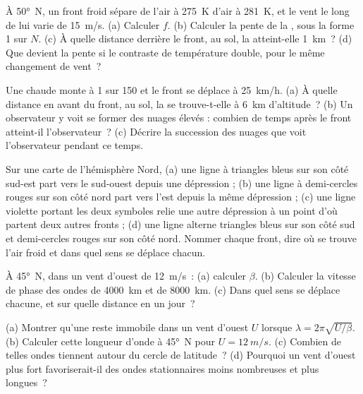 \begin{exercise}[$\star$]\label{exo:b2:weather-systems:1}
À \ang{50}~N, un front froid sépare de l'air à \qty{275}{K} d'air à \qty{281}{K}, et le vent
le long de lui varie de \qty{15}{m/s}. (a) Calculer $f$. (b) Calculer la pente de la ,
sous la forme 1 sur $N$. (c) À quelle distance derrière le front, au sol, la  atteint-elle
\qty{1}{km}~? (d) Que devient la pente si le contraste de température double, pour le même
changement de vent~?
\end{exercise}

\begin{exercise}[$\star$]\label{exo:b2:weather-systems:2}
Une  chaude monte à 1 sur 150 et le front se déplace à \qty{25}{km/h}. (a) À quelle distance
en avant du front, au sol, la  se trouve-t-elle à \qty{6}{km} d'altitude~? (b) Un observateur y voit
se former des nuages élevés : combien de temps après le front atteint-il l'observateur~? (c) Décrire la succession
des nuages que voit l'observateur pendant ce temps.
\end{exercise}

\begin{exercise}[$\star$]\label{exo:b2:weather-systems:3}
Sur une carte de l'hémisphère Nord, (a) une ligne à triangles bleus sur son côté sud-est part vers le sud-ouest
depuis une dépression ; (b) une ligne à demi-cercles rouges sur son côté nord part vers l'est depuis la même dépression ; (c) une
ligne violette portant les deux symboles relie une autre dépression à un point d'où partent deux autres fronts ; (d) une
ligne alterne triangles bleus sur son côté sud et demi-cercles rouges sur son côté nord. Nommer chaque front, dire où se trouve
l'air froid et dans quel sens se déplace chacun.
\end{exercise}

\begin{exercise}[$\star$]\label{exo:b2:weather-systems:4}
À \ang{45}~N, dans un vent d'ouest de \qty{12}{m/s}~: (a) calculer $\beta$. (b) Calculer la vitesse de phase
des ondes de \qty{4000}{km} et de \qty{8000}{km}. (c) Dans quel sens se déplace chacune, et sur quelle distance en un
jour~?
\end{exercise}

\begin{exercise}[$\star\star$]\label{exo:b2:weather-systems:5}
(a) Montrer qu'une  reste immobile dans un vent d'ouest $U$ lorsque $\lambda = 2\pi\sqrt{U/\beta}$.
(b) Calculer cette longueur d'onde à \ang{45}~N pour $U = \qty{12}{m/s}$. (c) Combien de telles ondes tiennent autour
du cercle de latitude~? (d) Pourquoi un vent d'ouest plus fort favoriserait-il des ondes stationnaires moins nombreuses et plus longues~?
\end{exercise}

